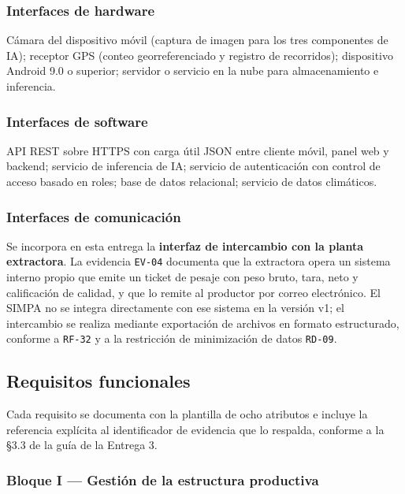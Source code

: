 \documentclass[11pt,a4paper]{article}
\newcommand{\id}[1]{\texttt{\begingroup\hyphenpenalty=10000\relax#1\endgroup}}
\renewcommand{\id}[1]{\texttt{#1}}
\begin{document}
\subsubsection{Interfaces de hardware}

Cámara del dispositivo móvil (captura de imagen para los tres componentes de IA); receptor GPS
(conteo georreferenciado y registro de recorridos); dispositivo Android 9.0 o superior; servidor o
servicio en la nube para almacenamiento e inferencia.

\subsubsection{Interfaces de software}

API REST sobre HTTPS con carga útil JSON entre cliente móvil, panel web y backend; servicio de
inferencia de IA; servicio de autenticación con control de acceso basado en roles; base de datos
relacional; servicio de datos climáticos.

\subsubsection{Interfaces de comunicación}

Se incorpora en esta entrega la \textbf{interfaz de intercambio con la planta extractora}. La
evidencia \id{EV-04} documenta que la extractora opera un sistema interno propio que emite un ticket
de pesaje con peso bruto, tara, neto y calificación de calidad, y que lo remite al productor por
correo electrónico. El SIMPA no se integra directamente con ese sistema en la versión v1; el
intercambio se realiza mediante exportación de archivos en formato estructurado, conforme a
\id{RF-32} y a la restricción de minimización de datos \id{RD-09}.

\subsection{Requisitos funcionales}

Cada requisito se documenta con la plantilla de ocho atributos e incluye la referencia explícita al
identificador de evidencia que lo respalda, conforme a la §3.3 de la guía de la Entrega 3.

\subsubsection{Bloque I --- Gestión de la estructura productiva}
\end{document}
